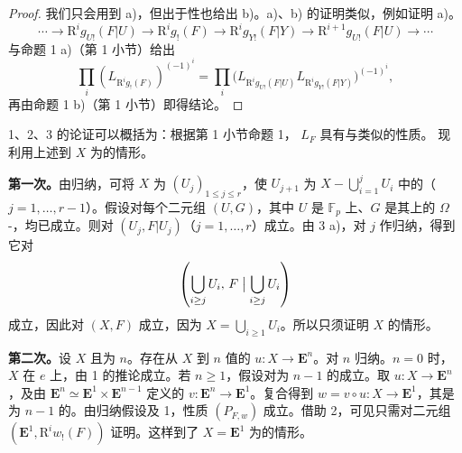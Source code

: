 \begin{proof}
我们只会用到 a)，但出于性也给出 b)。a)、b) 的证明类似，例如证明 a)。
\[
\cdots\longrightarrow\mathrm R^ig_{U!}(F|U)\longrightarrow\mathrm R^ig_!(F)
\longrightarrow\mathrm R^ig_{Y!}(F|Y)\longrightarrow\mathrm R^{i+1}g_{U!}(F|U)\longrightarrow\cdots
\]
与命题 1 a)（第 1 小节）给出
\[
\prod_i(L_{\mathrm R^ig_!(F)})^{(-1)^i}
=\prod_i\bigl(L_{\mathrm R^ig_{U!}(F|U)}L_{\mathrm R^ig_{Y!}(F|Y)}\bigr)^{(-1)^i},
\]
再由命题 1 b)（第 1 小节）即得结论。
\end{proof}
 1、2、3 的论证可以概括为：根据第 1 小节命题 1， $L_F$ 具有与类似的性质。
现利用上述到 $X$ 为的情形。

\textbf{第一次。}由归纳，可将 $X$ 为 $(U_j)_{1\leq j\leq r}$，使 $U_{j+1}$ 为 $X-\bigcup_{i=1}^jU_i$ 中的（$j=1,\ldots,r-1$）。假设对每个二元组 $(U,G)$，其中 $U$ 是 $\mathbb F_p$ 上、$G$ 是其上的 $\Omega$-，均已成立。则对 $(U_j,F|U_j)$（$j=1,\ldots,r$）成立。由 3 a)，对 $j$ 作归纳，得到它对
\[
\left(\bigcup_{i\geq j}U_i,\,F\bigm|\bigcup_{i\geq j}U_i\right)
\]
成立，因此对 $(X,F)$ 成立，因为 $X=\bigcup_{i\geq1}U_i$。所以只须证明 $X$ 的情形。

\textbf{第二次。}设 $X$ 且为 $n$。存在从 $X$ 到 $n$ 值的 $u:X\to\mathbf E^n$。对 $n$ 归纳。$n=0$ 时，$X$ 在 $e$ 上，由 1 的推论成立。若 $n\geq1$，假设对为 $n-1$ 的成立。取 $u:X\to\mathbf E^n$，及由 $\mathbf E^n\simeq\mathbf E^1\times\mathbf E^{n-1}$ 定义的 $v:\mathbf E^n\to\mathbf E^1$。复合得到 $w=v\circ u:X\to\mathbf E^1$，其是为 $n-1$ 的。由归纳假设及 1，性质 $(P_{F,w})$ 成立。借助 2，可见只需对二元组
$(\mathbf E^1,\mathrm R^iw_!(F))$ 证明。这样到了 $X=\mathbf E^1$ 为的情形。

